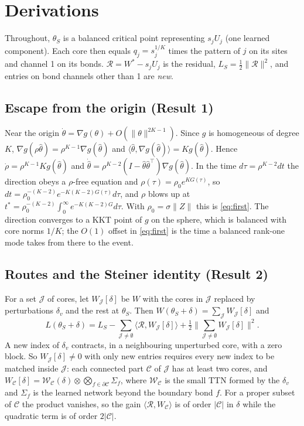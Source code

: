 \documentclass[11pt]{article}
\begin{document}
\clearpage
\appendix
\section{Derivations}

Throughout, $\theta_S$ is a balanced critical point representing $s_jU_j$ (one learned component). Each core
then equals $q_j=s_j^{1/K}$ times the pattern of $j$ on its sites and channel 1 on its bonds. $\mathcal R=W^*-s_jU_j$
is the residual, $L_S=\tfrac12\lVert\mathcal R\rVert^2$, and entries on bond channels other than 1 are \emph{new}.

\subsection{Escape from the origin (Result 1)}
Near the origin $\dot\theta=\nabla g(\theta)+O(\lVert\theta\rVert^{2K-1})$. Since $g$ is homogeneous of degree $K$,
$\nabla g(\rho\hat\theta)=\rho^{K-1}\nabla g(\hat\theta)$ and $\langle\hat\theta,\nabla g(\hat\theta)\rangle=Kg(\hat\theta)$.
Hence $\dot\rho=\rho^{K-1}Kg(\hat\theta)$ and $\dot{\hat\theta}=\rho^{K-2}(I-\hat\theta\hat\theta^\top)\nabla g(\hat\theta)$.
In the time $d\tau=\rho^{K-2}dt$ the direction obeys a $\rho$-free equation and $\rho(\tau)=\rho_0e^{KG(\tau)}$, so
$dt=\rho_0^{-(K-2)}e^{-K(K-2)G(\tau)}d\tau$, and $\rho$ blows up at
$t^*=\rho_0^{-(K-2)}\int_0^\infty e^{-K(K-2)G}d\tau$. With $\rho_0=\sigma\lVert Z\rVert$ this is \eqref{eq:first}. The
direction converges to a KKT point of $g$ on the sphere, which is balanced with core norms $1/K$; the $O(1)$
offset in \eqref{eq:first} is the time a balanced rank-one mode takes from there to the event.

\subsection{Routes and the Steiner identity (Result 2)}
For a set $\mathcal J$ of cores, let $W_{\mathcal J}[\delta]$ be $W$ with the cores in $\mathcal J$ replaced by
perturbations $\delta_v$ and the rest at $\theta_S$. Then $W(\theta_S+\delta)=\sum_{\mathcal J}W_{\mathcal J}[\delta]$ and
\begin{equation}
L(\theta_S+\delta)=L_S-\sum_{\mathcal J\ne\emptyset}\langle\mathcal R,W_{\mathcal J}[\delta]\rangle
+\tfrac12\Big\lVert\sum_{\mathcal J\ne\emptyset}W_{\mathcal J}[\delta]\Big\rVert^2 .
\end{equation}
A new index of $\delta_v$ contracts, in a neighbouring unperturbed core, with a zero block. So
$W_{\mathcal J}[\delta]\ne0$ with only new entries requires every new index to be matched inside $\mathcal J$:
each connected part $\mathcal C$ of $\mathcal J$ has at least two cores, and
$W_{\mathcal C}[\delta]=\mathcal W_{\mathcal C}(\delta)\otimes\bigotimes_{f\in\partial\mathcal C}\Sigma_f$, where $\mathcal W_{\mathcal C}$ is the small TTN
formed by the $\delta_v$ and $\Sigma_f$ is the learned network beyond the boundary bond $f$. For a proper subset of
$\mathcal C$ the product vanishes, so the gain $\langle\mathcal R,W_{\mathcal C}\rangle$ is of order $\lvert\mathcal C\rvert$ in $\delta$
while the quadratic term is of order $2\lvert\mathcal C\rvert$.
\end{document}
